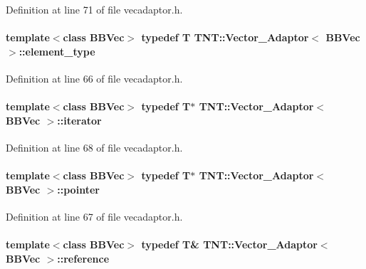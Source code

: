 Definition at line 71 of file vecadaptor.h.

\paragraph[{element\_\-type}]{\setlength{\rightskip}{0pt plus 5cm}template$<$class BBVec$>$ typedef {\bf T} {\bf TNT::Vector\_\-Adaptor}$<$ BBVec $>$::{\bf element\_\-type}}\hfill\label{class_t_n_t_1_1_vector___adaptor_ae7e58ba9bd702d20ff419a36b54627c9}


Definition at line 66 of file vecadaptor.h.

\paragraph[{iterator}]{\setlength{\rightskip}{0pt plus 5cm}template$<$class BBVec$>$ typedef {\bf T}$\ast$ {\bf TNT::Vector\_\-Adaptor}$<$ BBVec $>$::{\bf iterator}}\hfill\label{class_t_n_t_1_1_vector___adaptor_a53f46904c8fdab6553959b7176829806}


Definition at line 68 of file vecadaptor.h.

\paragraph[{pointer}]{\setlength{\rightskip}{0pt plus 5cm}template$<$class BBVec$>$ typedef {\bf T}$\ast$ {\bf TNT::Vector\_\-Adaptor}$<$ BBVec $>$::{\bf pointer}}\hfill\label{class_t_n_t_1_1_vector___adaptor_a7ea8869896cd022dddda67b59dc65010}


Definition at line 67 of file vecadaptor.h.

\paragraph[{reference}]{\setlength{\rightskip}{0pt plus 5cm}template$<$class BBVec$>$ typedef {\bf T}\& {\bf TNT::Vector\_\-Adaptor}$<$ BBVec $>$::{\bf reference}}\hfill\label{class_t_n_t_1_1_vector___adaptor_a0b32370a0c8d85460988cca7ac36cfca}



